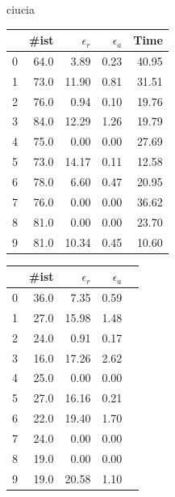\documentclass{beamer}
\begin{document}
\begin{frame}{ciucia}
	\begin{minipage}{0.5\textwidth}
		\centering
		\begin{tabular}{lrrrr}
			{} & \#ist & $\epsilon_r$ & $\epsilon_a$ & Time  \\
			\hline
			0  & 64.0  & 3.89         & 0.23         & 40.95 \\
			1  & 73.0  & 11.90        & 0.81         & 31.51 \\
			2  & 76.0  & 0.94         & 0.10         & 19.76 \\
			3  & 84.0  & 12.29        & 1.26         & 19.79 \\
			4  & 75.0  & 0.00         & 0.00         & 27.69 \\
			5  & 73.0  & 14.17        & 0.11         & 12.58 \\
			6  & 78.0  & 6.60         & 0.47         & 20.95 \\
			7  & 76.0  & 0.00         & 0.00         & 36.62 \\
			8  & 81.0  & 0.00         & 0.00         & 23.70 \\
			9  & 81.0  & 10.34        & 0.45         & 10.60 \\
		\end{tabular}
	\end{minipage}
	\begin{minipage}{0.5\textwidth}
		\centering
		\begin{tabular}{lrrrr}
			{} & \#ist & $\epsilon_r$ & $\epsilon_a$ \\
			\hline
			0  & 36.0  & 7.35         & 0.59         \\
			1  & 27.0  & 15.98        & 1.48         \\
			2  & 24.0  & 0.91         & 0.17         \\
			3  & 16.0  & 17.26        & 2.62         \\
			4  & 25.0  & 0.00         & 0.00         \\
			5  & 27.0  & 16.16        & 0.21         \\
			6  & 22.0  & 19.40        & 1.70         \\
			7  & 24.0  & 0.00         & 0.00         \\
			8  & 19.0  & 0.00         & 0.00         \\
			9  & 19.0  & 20.58        & 1.10         \\
		\end{tabular}
	\end{minipage}
\end{frame}
					
\end{document}
